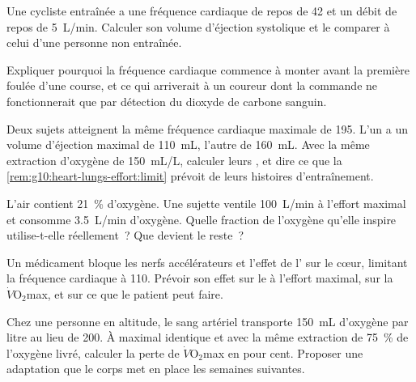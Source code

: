 \begin{exercise}[$\star\star$]\label{exo:g10:heart-lungs-effort:10}
Une cycliste entraînée a une fréquence cardiaque de repos de 42 et un
débit de repos de \qty{5}{L/min}. Calculer son volume d'éjection
systolique et le comparer à celui d'une personne non entraînée.
\end{exercise}

\begin{exercise}[$\star\star$]\label{exo:g10:heart-lungs-effort:11}
Expliquer pourquoi la fréquence cardiaque commence à monter avant la
première foulée d'une course, et ce qui arriverait à un coureur dont la
commande ne fonctionnerait que par détection du dioxyde de carbone
sanguin.
\end{exercise}

\begin{exercise}[$\star\star\star$]\label{exo:g10:heart-lungs-effort:12}
Deux sujets atteignent la même fréquence cardiaque maximale de 195.
L'un a un volume d'éjection maximal de \qty{110}{mL}, l'autre de
\qty{160}{mL}. Avec la même extraction d'oxygène de \qty{150}{mL/L},
calculer leurs , et dire ce que la
\cref{rem:g10:heart-lungs-effort:limit} prévoit de leurs histoires
d'entraînement.
\end{exercise}

\begin{exercise}[$\star\star\star$]\label{exo:g10:heart-lungs-effort:13}
L'air contient 21~\% d'oxygène. Une sujette ventile \qty{100}{L/min} à
l'effort maximal et consomme \qty{3.5}{L/min} d'oxygène. Quelle
fraction de l'oxygène qu'elle inspire utilise-t-elle réellement~? Que
devient le reste~?
\end{exercise}

\begin{exercise}[$\star\star\star$]\label{exo:g10:heart-lungs-effort:14}
Un médicament bloque les nerfs accélérateurs et l'effet de
l' sur le cœur, limitant la fréquence cardiaque à 110.
Prévoir son effet sur le  à l'effort maximal, sur la
$\dot V\!\mathrm{O_2}$max, et sur ce que le patient peut faire.
\end{exercise}

\begin{exercise}[$\star\star\star$]\label{exo:g10:heart-lungs-effort:15}
Chez une personne en altitude, le sang artériel transporte
\qty{150}{mL} d'oxygène par litre au lieu de \num{200}. À  maximal identique et avec la même extraction de 75~\% de
l'oxygène livré, calculer la perte de $\dot V\!\mathrm{O_2}$max en pour
cent. Proposer une adaptation que le corps met en place les semaines
suivantes.
\end{exercise}


